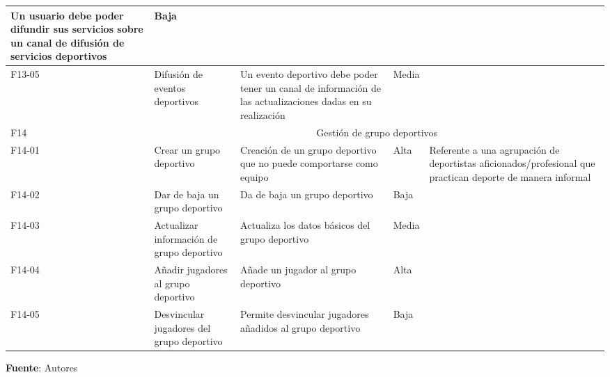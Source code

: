 \begin{center}
\begin{longtable}{|p{1.5cm}|p{3cm}|p{5cm}|p{2cm}|p{3cm}|}
			Un usuario debe poder difundir sus servicios sobre un canal de difusión de servicios deportivos &
			Baja & 
			\\
			\hline
			F13-05 & 
			Difusión de eventos deportivos &
			Un evento deportivo debe poder tener un canal de información de las actualizaciones dadas en su realización &
			Media & 
			\\
			\hline
			F14 &
			\multicolumn{4}{c|}{Gestión de grupo deportivos} \\
			\hline
			F14-01 &	
			Crear un grupo deportivo &
			Creación de un grupo deportivo que no puede comportarse como equipo &
			Alta &
			Referente a una agrupación de deportistas aficionados/profesional que practican deporte de manera informal
			\\
			\hline
			F14-02 &
			Dar de baja un grupo deportivo &
			Da de baja un grupo deportivo &
			Baja &
			\\
			\hline
			F14-03 &
			Actualizar información de grupo deportivo &
			Actualiza los datos básicos del grupo deportivo &
			Media &
			\\
			\hline
			F14-04 &
			Añadir jugadores al grupo deportivo &
			Añade un jugador al grupo deportivo &
			Alta &
			\\
			\hline
			F14-05 &
			Desvincular jugadores del grupo deportivo &
			Permite desvincular jugadores añadidos al grupo deportivo &
			Baja &
			\\
			\hline
		\end{longtable}
		\textbf{Fuente}: Autores
	\end{center}